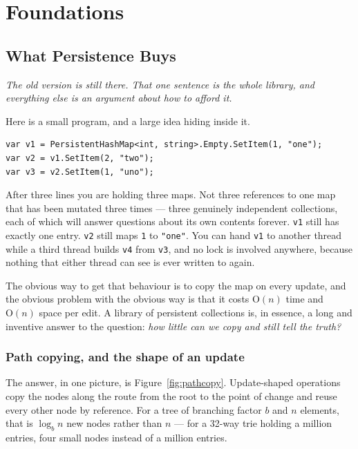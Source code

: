 \documentclass[11pt,twoside,openright]{book}
\newcommand{\code}[1]{\texorpdfstring{\textcolor{d7ink}{\texttt{#1}}}{#1}}
\newcommand{\bigoh}[1]{$\mathrm{O}(#1)$}
\newcommand{\motto}[1]{%
  \begingroup
  \vspace{-4pt}\hfill\begin{minipage}{0.80\textwidth}
    \raggedleft\itshape\color{d7slate}\small #1\par
  \end{minipage}\par\vspace{18pt}
  \endgroup}
\begin{document}
\mainmatter

\part{Foundations}
\label{part:foundations}

\chapter{What Persistence Buys}
\label{ch:persistence}

\motto{The old version is still there. That one sentence is the whole
library, and everything else is an argument about how to afford it.}

\noindent
Here is a small program, and a large idea hiding inside it.

\begin{lstlisting}[language={[Sharp]C}]
var v1 = PersistentHashMap<int, string>.Empty.SetItem(1, "one");
var v2 = v1.SetItem(2, "two");
var v3 = v2.SetItem(1, "uno");
\end{lstlisting}

\noindent
After three lines you are holding three maps. Not three references to one map
that has been mutated three times --- three genuinely independent collections,
each of which will answer questions about its own contents forever. \code{v1}
still has exactly one entry. \code{v2} still maps \code{1} to \code{"one"}. You
can hand \code{v1} to another thread while a third thread builds \code{v4} from
\code{v3}, and no lock is involved anywhere, because nothing that either thread
can see is ever written to again.

The obvious way to get that behaviour is to copy the map on every update, and
the obvious problem with the obvious way is that it costs \bigoh{n} time and
\bigoh{n} space per edit. A library of persistent collections is, in essence, a
long and inventive answer to the question: \emph{how little can we copy and
still tell the truth?}

\section{Path copying, and the shape of an update}

The answer, in one picture, is Figure~\ref{fig:pathcopy}. Update-shaped
operations copy the nodes along the route from the root to the point of change
and reuse every other node by reference. For a tree of branching factor $b$ and
$n$ elements, that is $\log_b n$ new nodes rather than $n$ --- for a 32-way trie
holding a million entries, four small nodes instead of a million entries.
\end{document}
